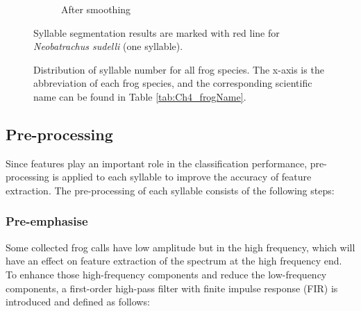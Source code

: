 \begin{figure}[htb!]
\begin{subfigure}[b]{0.6\linewidth}
                \caption{After smoothing}
        \end{subfigure}
        \caption[Syllable segmentation results]{Syllable segmentation results are marked with red
line for \textit{Neobatrachus sudelli} (one syllable).}       
        \label{fig:smooth}
\end{figure}



\begin{figure}[htb!] %
\caption[Distribution of syllable number for all frog species]{Distribution of syllable number for all frog species. The x-axis is the abbreviation of each frog species, and the corresponding scientific name can be found in Table \ref{tab:Ch4_frogName}.}
\label{fig:Ch4_syllable} 
\end{figure}


\subsection{Pre-processing}
Since features play an important role in the classification performance, pre-processing is applied to each syllable to improve the accuracy of feature extraction. The pre-processing of each syllable consists of the following steps:

\subsubsection{Pre-emphasise}
Some collected frog calls have low amplitude but in the high frequency, which will have an effect on feature extraction of the spectrum at the high frequency end. To enhance those high-frequency components and reduce the low-frequency components, a first-order high-pass filter with finite impulse response (FIR) is introduced and defined as follows:

